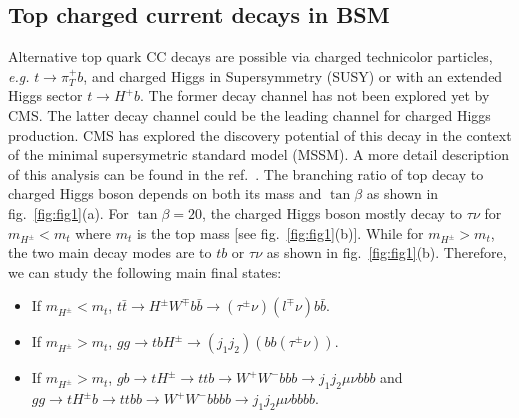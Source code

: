 \documentclass{cimento}
\begin{document}
\subsection{Top charged current decays in BSM}
\label{sec:CC}

Alternative top quark CC decays are possible via charged technicolor
particles, {\it e.g.} $t\rightarrow \pi^+_{T}b$,  and charged Higgs in 
Supersymmetry (SUSY) or with an extended Higgs sector $t\rightarrow H^{+}b$. 
The former
decay channel has not been explored yet by CMS. The latter decay channel
could be the leading channel for charged Higgs production. CMS has
explored the discovery potential of this decay in the context
of the minimal supersymetric standard model (MSSM). A more detail
description of this analysis can be found in the ref.~\cite{ref:ptdr2}.
The branching ratio of top decay to charged Higgs boson depends on both its
mass and $\tan \beta$ as shown in fig.~\ref{fig:fig1}(a). For $\tan \beta=20$,
the charged Higgs boson mostly decay to $\tau \nu$ for $m_{H^{\pm}}<m_{t}$ where
$m_{t}$ is the top mass [see fig.~\ref{fig:fig1}(b)]. While for $m_{H^{\pm}}>m_{t}$, 
the two main decay modes are to $tb$ or $\tau \nu$ as shown in fig.~\ref{fig:fig1}(b).
Therefore, we can study the following main final states:

\begin{itemize}
\item If $m_{H^{\pm}}<m_{t}$, $t\bar{t}\rightarrow H^{\pm}W^{\mp}b\bar{b}\rightarrow (\tau^{\pm}\nu)(l^{\mp}\nu)b\bar{b}$.
\item If $m_{H^{\pm}}>m_{t}$, $gg\rightarrow tbH^{\pm}\rightarrow (j_{1}j_{2})(bb(\tau^{\pm}\nu))$.
\item If $m_{H^{\pm}}>m_{t}$, $gb\rightarrow tH^{\pm} \rightarrow ttb \rightarrow W^+W^-bbb\rightarrow j_1j_2\mu\nu bbb$ and $gg\rightarrow tH^{\pm}b \rightarrow ttbb \rightarrow W^+W^-bbbb\rightarrow j_1j_2\mu\nu bbbb$.
\end{itemize}

  
\end{document}
